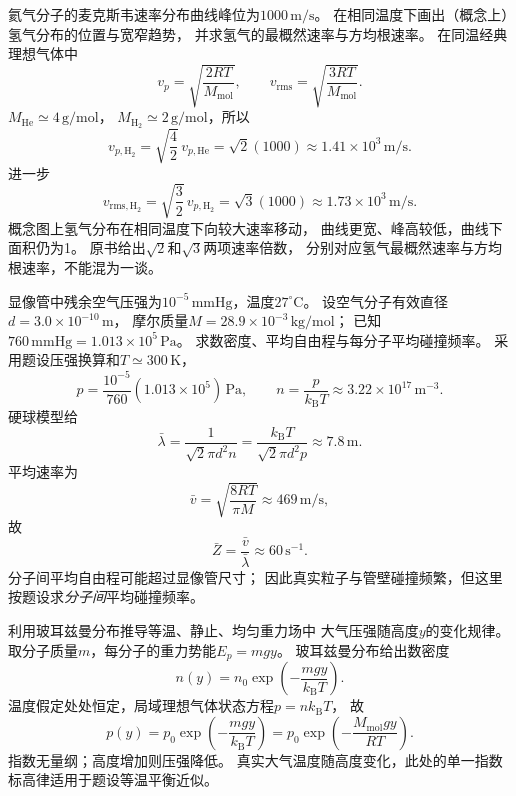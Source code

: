 \problemtext 氦气分子的麦克斯韦速率分布曲线峰位为$1000\,\mathrm{m/s}$。
在相同温度下画出（概念上）氢气分布的位置与宽窄趋势，
并求氢气的最概然速率与方均根速率。
\workings
在同温经典理想气体中
\[
v_p=\sqrt{\frac{2RT}{M_{\mathrm{mol}}}},\qquad
v_{\mathrm{rms}}=\sqrt{\frac{3RT}{M_{\mathrm{mol}}}}.
\]
$M_{\mathrm{He}}\simeq4\,\mathrm{g/mol}$，
$M_{\mathrm{H_2}}\simeq2\,\mathrm{g/mol}$，所以
\[
\boxed{v_{p,\mathrm{H_2}}
=\sqrt{\frac{4}{2}}\,v_{p,\mathrm{He}}
=\sqrt2(1000)\approx1.41\times10^3\,\mathrm{m/s}}.
\]
进一步
\[
\boxed{v_{\mathrm{rms,H_2}}
=\sqrt{\frac32}\,v_{p,\mathrm{H_2}}
=\sqrt3(1000)\approx1.73\times10^3\,\mathrm{m/s}}.
\]
概念图上氢气分布在相同温度下向较大速率移动，
曲线更宽、峰高较低，曲线下面积仍为1。
\crosscheck 原书给出$\sqrt2$和$\sqrt3$两项速率倍数，
分别对应氢气最概然速率与方均根速率，不能混为一谈。

\problemtext 显像管中残余空气压强为$10^{-5}\,\mathrm{mmHg}$，温度$27^\circ\mathrm C$。
设空气分子有效直径$d=3.0\times10^{-10}\,\mathrm m$，
摩尔质量$M=28.9\times10^{-3}\,\mathrm{kg/mol}$；
已知$760\,\mathrm{mmHg}=1.013\times10^5\,\mathrm{Pa}$。
求数密度、平均自由程与每分子平均碰撞频率。
\workings
采用题设压强换算和$T\simeq300\,\mathrm K$，
\[
p=\frac{10^{-5}}{760}(1.013\times10^5)\,\mathrm{Pa},
\qquad
\boxed{n=\frac p{k_{\mathrm B}T}\approx3.22\times10^{17}\,\mathrm{m^{-3}}}.
\]
硬球模型给
\[
\boxed{\bar\lambda
=\frac1{\sqrt2\pi d^2 n}
=\frac{k_{\mathrm B}T}{\sqrt2\pi d^2p}
\approx7.8\,\mathrm m}.
\]
平均速率为
\[
\bar v=\sqrt{\frac{8RT}{\pi M}}\approx469\,\mathrm{m/s},
\]
故
\[
\boxed{\bar Z=\frac{\bar v}{\bar\lambda}
\approx60\,\mathrm{s^{-1}}}.
\]
\crosscheck 分子间平均自由程可能超过显像管尺寸；
因此真实粒子与管壁碰撞频繁，但这里按题设求\emph{分子间}平均碰撞频率。

\problemtext 利用玻耳兹曼分布推导等温、静止、均匀重力场中
大气压强随高度$y$的变化规律。
\workings
取分子质量$m$，每分子的重力势能$E_p=mgy$。
玻耳兹曼分布给出数密度
\[
n(y)=n_0\exp\left(-\frac{mgy}{k_{\mathrm B}T}\right).
\]
温度假定处处恒定，局域理想气体状态方程$p=nk_{\mathrm B}T$，
故
\[
\boxed{p(y)=p_0\exp\left(-\frac{mgy}{k_{\mathrm B}T}\right)}
=\boxed{p_0\exp\left(-\frac{M_{\mathrm{mol}}gy}{RT}\right)}.
\]
\crosscheck 指数无量纲；高度增加则压强降低。
真实大气温度随高度变化，此处的单一指数标高律适用于题设等温平衡近似。

